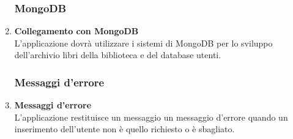 \documentclass{article}
\begin{document}
\begin{enumerate}
    \subsubsection{MongoDB}
        \item \textbf{Collegamento con MongoDB}\label{sec:RF28}\\
        L’applicazione dovrà utilizzare i sistemi di MongoDB per lo sviluppo dell’archivio libri della biblioteca e del database utenti.
    \subsubsection{Messaggi d'errore}
        \item \textbf{Messaggi d'errore}\label{sec:RF29}\\
        L’applicazione restituisce un messaggio un messaggio d’errore quando un inserimento dell’utente non è quello richiesto o è sbagliato.


    \end{enumerate}
\end{document}

